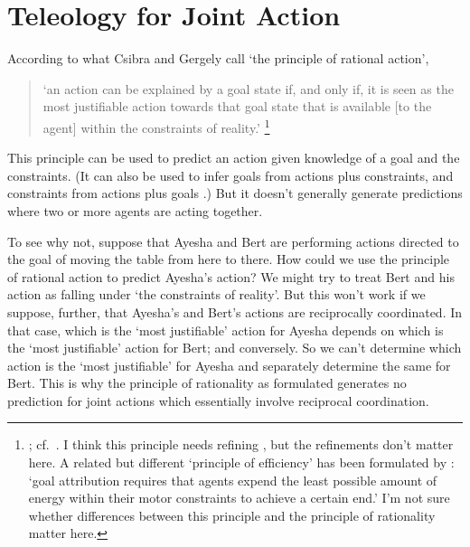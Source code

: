 \documentclass[12pt,\papersize]{extarticle}
\begin{document}
\setlength\footnotesep{1em}


\author{}
\date{}



\setcounter{secnumdepth}{-1} 




\section{Teleology for Joint Action}
According to 
what Csibra and Gergely call `the principle of rational action',
%
\begin{quote}
`an action can be explained by a goal state if, and only if, it is seen as the most justifiable action towards that goal state that is available [to the agent] within the constraints of reality.'%
%
\footnote{
\citet[p.\ 255]{Csibra:1998cx}; cf.\ \citet{Csibra:2003jv}.
I think this principle needs refining \citep[pp.\ 6--7]{butterfill:2012_interacting}, but the refinements don't matter here.
A related but different `principle of efficiency' has been formulated by \citet[p.\ 1061]{Southgate:2008el}:
`goal attribution requires that agents expend the least possible amount of energy within their motor constraints to achieve a certain end.'
I'm not sure whether differences between this principle and the principle of rationality matter here.
}
%
\end{quote}
%
This principle can be used to predict an action given knowledge of a goal and the constraints.  
(It can also be used to infer goals from actions plus constraints, and constraints from actions plus goals \citep{Csibra:2003kp}.)
But it doesn't generally generate predictions where two or more agents are acting together.

To see why not, suppose that Ayesha and Bert are performing actions directed to the goal of moving the table from here to there. 
How could we use the principle of rational action to predict Ayesha's action?
We might try to treat Bert and his action as falling under `the constraints of reality'.
But this won't work if we suppose, further, that Ayesha's and Bert's actions are reciprocally coordinated. 
In that case, which is the `most justifiable' action for Ayesha depends on which is the `most justifiable' action for Bert; and conversely.
So we can't determine which action is the `most justifiable' for Ayesha and separately determine the same for Bert.
This is why the principle of rationality as formulated generates no prediction for joint actions which essentially involve reciprocal coordination.
\end{document}
